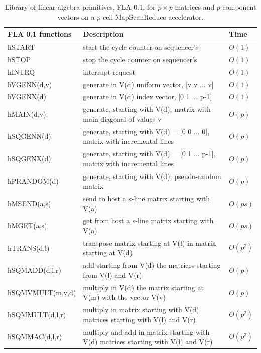 \begin{exemplu}
{\em
\begin{table}[H]
	\centering                       
	\caption{Library of linear algebra primitives, FLA 0.1,  for $p \times p$ matrices and $p$-component vectors on a $p$-cell MapScanReduce accelerator. }           
	\label{prim}       %
	\begin{tabular}{|p{}|p{}|p{}| } \hline  %
		{\bf FLA 0.1 functions}    & {\bf Description}                                 & {\bf Time}  \\ \hline \hline
        hSTART            & start the cycle counter on sequencer's            & $O(1)$ \\ \hline
        hSTOP             & stop the cycle counter on sequencer's             & $O(1)$ \\ \hline
        hINTRQ            & interrupt request                                 & $O(1)$ \\ \hline
        hVGENN(d,v)       & generate in V(d) uniform vector, [v v ... v]                                    & $O(1)$ \\ \hline
        hVGENX(d)         & generate in V(d) index vector, [0 1 ... p-1]                                    & $O(1)$ \\ \hline
        hMAIN(d,v)        & generate, starting with V(d), matrix with main diagonal of values v             & $O(p)$ \\ \hline
        hSQGENN(d)        & generate, starting with V(d) = [0 0 ... 0], matrix with incremental lines       & $O(p)$ \\ \hline
        hSQGENX(d)        & generate, starting with V(d) = [0 1 ... p-1], matrix with incremental lines     & $O(p)$ \\ \hline
        hPRANDOM(d)       & generate, starting with V(d), pseudo-random matrix                              & $O(p)$ \\ \hline
        hMSEND(a,s)       & send to host a s-line matrix starting with V(a)                                 & $O(ps)$ \\ \hline
        hMGET(a,s)        & get from host a s-line matrix starting with V(a)                                & $O(ps)$ \\ \hline
        hTRANS(d,l)       & transpose matrix starting at V(l) in matrix starting at V(d)                    & $O(p^2)$ \\ \hline
        hSQMADD(d,l,r)    & add starting from V(d) the matrices starting from V(l) and V(r)                 & $O(p)$ \\ \hline
        hSQMVMULT(m,v,d)  & multiply in V(d) the matrix starting at V(m) with the vector V(v)               & $O(p)$ \\ \hline
        hSQMMULT(d,l,r)   & multiply in matrix starting with V(d) matrices starting with V(l) and V(r)      & $O(p^2)$ \\ \hline
        hSQMMAC(d,l,r)    & multiply and add in matrix starting with V(d) matrices starting with V(l) and V(r)      & $O(p^2)$ \\ \hline
	\end{tabular}
\end{table}
}


\end{exemplu}
